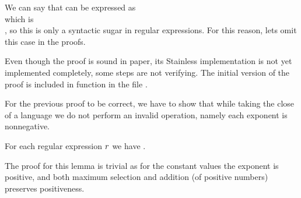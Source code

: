 We can say that  can be expressed as \\  which is \\ , so this is only a syntactic sugar in regular expressions. For this reason, lets omit this case in the proofs.

Even though the proof is sound in paper, its Stainless implementation is not yet implemented completely, some steps are not verifying. The initial version of the proof is included in function  in the file .

For the previous proof to be correct, we have to show that while taking the close of a language we do not perform an invalid operation, namely each exponent is nonnegative.

\begin{lemma}
	\label{lem:evalExpPositive}
	For each regular expression $r$ we have .
\end{lemma}

The proof for this lemma is trivial as for the constant values the exponent is positive, and both maximum selection and addition (of positive numbers) preserves positiveness.
